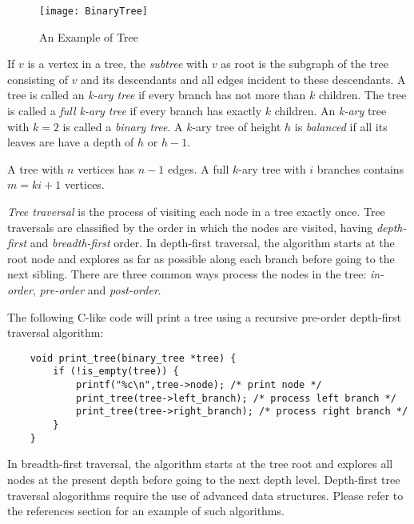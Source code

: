 \begin{figure}[h]
\centering\texttt{[image: BinaryTree]}
\caption{\label{fig:BinaryTree-Example}An Example of Tree}
\end{figure}

If $v$ is a vertex in a tree, the \emph{subtree} with $v$ as root is the subgraph of the tree consisting of $v$ and its descendants and all edges incident to these descendants. A tree is called an \emph{k-ary tree} if every branch has not more than $k$ children. The tree is called a \emph{full k-ary tree} if every branch has exactly $k$ children. An \emph{k-ary} tree with $k=2$ is called a \emph{binary tree}. A $k$-ary tree of height $h$ is \emph{balanced} if all its leaves are have a depth of $h$ or $h-1$.

\begin{example}
A tree with $n$ vertices has $n-1$ edges. A full $k$-ary tree with $i$ branches contains $m=ki+1$ vertices.
\end{example}

\emph{Tree traversal} is the process of visiting each node in a tree exactly once. Tree traversals are classified by the order in which the nodes are visited, having \emph{depth-first} and \emph{breadth-first} order. In depth-first traversal, the algorithm starts at the root node and explores as far as possible along each branch before going to the next sibling. There are three common ways process the nodes in the tree: \emph{in-order}, \emph{pre-order} and \emph{post-order}.

The following C-like code will print a tree using a recursive pre-order depth-first traversal algorithm:

\begin{verbatim}
    void print_tree(binary_tree *tree) {
        if (!is_empty(tree)) {
            printf("%c\n",tree->node); /* print node */
            print_tree(tree->left_branch); /* process left branch */
            print_tree(tree->right_branch); /* process right branch */
        }
    }
\end{verbatim}

In breadth-first traversal, the algorithm starts at the tree root and explores all nodes at the present depth before going to the next depth level. Depth-first tree traversal alogorithms require the use of advanced data structures. Please refer to the references section for an example of such algorithms.

